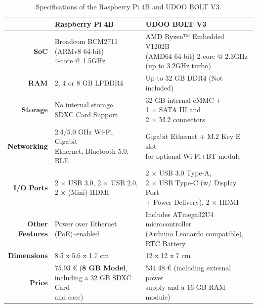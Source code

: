 \renewcommand{\arraystretch}{2.5}
\begin{table}[H]
    \centering
    \caption{Specifications of the Raspberry Pi 4B and UDOO BOLT V3.}
    \begin{tabular}{r|l|l}
        & \textbf{Raspberry Pi 4B}& \textbf{UDOO BOLT V3}  \\ \hline
        \textbf{SoC} &  \makecell{Broadcom BCM2711 \\ (ARMv8 64-bit) \\ 4-core @ 1.5GHz} & \makecell{AMD Ryzen™ Embedded V1202B \\ (AMD64 64-bit) 2-core @ 2.3GHz \\ (up to 3.2GHz turbo)}\\
        \textbf{RAM} & 2, 4 or 8 GB LPDDR4 & Up to 32 GB DDR4 (Not included) \\ 
        \textbf{Storage} & \makecell{No internal storage, \\ SDXC Card Support} & \makecell{32 GB internal eMMC + \\1 × SATA III and \\ 2 × M.2 connectors}\\
        \textbf{Networking} & \makecell{2.4/5.0 GHz Wi-Fi, Gigabit \\ Ethernet, Bluetooth 5.0, BLE} & \makecell{Gigabit Ethernet + M.2 Key E slot \\ for optional Wi-Fi+BT module}\\ 
        \textbf{I/O Ports} & \makecell{ 2 × USB 3.0, 2 × USB 2.0, \\ 2 × (Mini) HDMI} & \makecell{2 × USB 3.0 Type-A, \\ 2 × USB Type-C (w/ Display Port \\ + Power Delivery), 2 × HDMI} \\
        \makecell[r]{\textbf{Other} \\\textbf{Features}} & \makecell{Power over Ethernet \\(PoE)–enabled} & \makecell{Includes ATmega32U4 microcontroller\\ (Arduino Leonardo compatible), \\ RTC Battery} \\   
        \textbf{Dimensions} & 8.5 x 5.6 x 1.7 cm & 12 x 12 x 7 cm \\
        \textbf{Price} & \makecell{75.93 € (\textbf{8 GB Model}, \\ including a 32 GB SDXC Card\\ and case)} & \makecell{534.48 € (including external power \\ supply and a 16 GB RAM module)} \\
    \end{tabular}
    \label{tab:comparsion-hardwareplatform}
\end{table}
\renewcommand{\arraystretch}{1}

